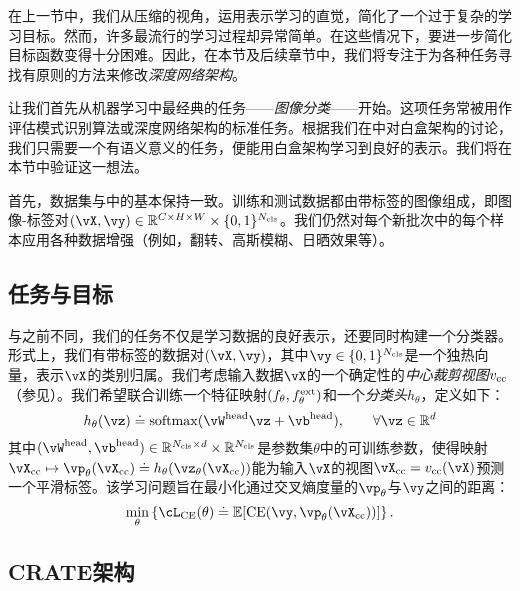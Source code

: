\documentclass[../../book-main.tex]{subfiles}
\begin{document}
\label{sec:image_classification}

在上一节中，我们从压缩的视角，运用表示学习的直觉，简化了一个过于复杂的学习目标。然而，许多最流行的学习过程却异常简单。在这些情况下，要进一步简化目标函数变得十分困难。因此，在本节及后续章节中，我们将专注于为各种任务寻找有原则的方法来修改\textit{深度网络架构}。

让我们首先从机器学习中最经典的任务——\textit{图像分类}——开始。这项任务常被用作评估模式识别算法或深度网络架构的标准任务。根据我们在中对白盒架构的讨论，我们只需要一个有语义意义的任务，便能用白盒架构学习到良好的表示。我们将在本节中验证这一想法。

首先，数据集与中的基本保持一致。训练和测试数据都由带标签的图像组成，即图像-标签对\((\vX, \vy) \in \R^{C \times H \times W} \times \{0, 1\}^{N_{\cls}}\)。我们仍然对每个新批次中的每个样本应用各种数据增强（例如，翻转、高斯模糊、日晒效果等）。

\subsection{任务与目标} \label{sub:image_classification_objective}

与之前不同，我们的任务不仅是学习数据的良好表示，还要同时构建一个分类器。形式上，我们有带标签的数据对\((\vX, \vy)\)，其中\(\vy \in \{0, 1\}^{N_{\cls}}\)是一个独热向量，表示\(\vX\)的类别归属。我们考虑输入数据\(\vX\)的一个确定性的\textit{中心裁剪视图}\(v_{\mathrm{cc}}\)（参见）。我们希望联合训练一个特征映射\((f_{\theta}, f_{\theta}^{\mathrm{ext}})\)和一个\textit{分类头}\(h_{\theta}\)，定义如下：
\begin{equation}
    h_{\theta}(\vz) \doteq \softmax(\vW^{\head}\vz + \vb^{\head}), \qquad  \forall \vz \in \R^{d}
\end{equation}
其中\((\vW^{\head}, \vb^{\head}) \in \R^{N_{\cls} \times d} \times \R^{N_{\cls}}\)是参数集\(\theta\)中的可训练参数，使得映射\(\vX_{\cc} \mapsto \vp_{\theta}(\vX_{\cc}) \doteq h_{\theta}(\vz_{\theta}(\vX_{\cc}))\)能为输入\(\vX\)的视图\(\vX_{\cc} = v_{\cc}(\vX)\)预测一个平滑标签。该学习问题旨在最小化通过交叉熵度量的\(\vp_{\theta}\)与\(\vy\)之间的距离：
\begin{equation}\label{eq:classification_ce_loss}
    \min_{\theta}\bc{\cL_{\CE}(\theta) \doteq \Ex[\CE(\vy, \vp_{\theta}(\vX_{\cc}))]}.
\end{equation}


\subsection{CRATE架构}\label{sub:image_classification_architecture}
\end{document}

